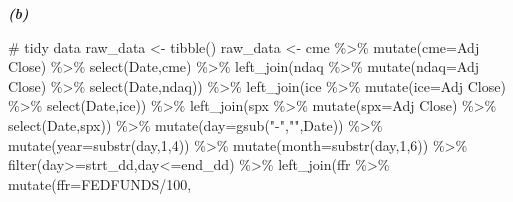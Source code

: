 \documentclass[
  a4paper,
  DIV=11,
  numbers=noendperiod]{scrreprt}
\newenvironment{Shaded}{\begin{snugshade}}{\end{snugshade}}
\newcommand{\AttributeTok}[1]{\textcolor[rgb]{0.40,0.45,0.13}{#1}}
\newcommand{\CommentTok}[1]{\textcolor[rgb]{0.37,0.37,0.37}{#1}}
\newcommand{\DecValTok}[1]{\textcolor[rgb]{0.68,0.00,0.00}{#1}}
\newcommand{\FunctionTok}[1]{\textcolor[rgb]{0.28,0.35,0.67}{#1}}
\newcommand{\NormalTok}[1]{\textcolor[rgb]{0.00,0.23,0.31}{#1}}
\newcommand{\OtherTok}[1]{\textcolor[rgb]{0.00,0.23,0.31}{#1}}
\newcommand{\SpecialCharTok}[1]{\textcolor[rgb]{0.37,0.37,0.37}{#1}}
\newcommand{\StringTok}[1]{\textcolor[rgb]{0.13,0.47,0.30}{#1}}
\begin{document}
\textbf{\emph{(b)}}

\begin{Shaded}
\begin{Highlighting}[]
\CommentTok{\# tidy data}
\NormalTok{raw\_data }\OtherTok{\textless{}{-}} \FunctionTok{tibble}\NormalTok{()}
\NormalTok{raw\_data }\OtherTok{\textless{}{-}}\NormalTok{ cme }\SpecialCharTok{\%\textgreater{}\%} \FunctionTok{mutate}\NormalTok{(}\AttributeTok{cme=}\StringTok{\textasciigrave{}}\AttributeTok{Adj Close}\StringTok{\textasciigrave{}}\NormalTok{) }\SpecialCharTok{\%\textgreater{}\%} \FunctionTok{select}\NormalTok{(Date,cme) }\SpecialCharTok{\%\textgreater{}\%} 
  \FunctionTok{left\_join}\NormalTok{(ndaq }\SpecialCharTok{\%\textgreater{}\%} \FunctionTok{mutate}\NormalTok{(}\AttributeTok{ndaq=}\StringTok{\textasciigrave{}}\AttributeTok{Adj Close}\StringTok{\textasciigrave{}}\NormalTok{) }\SpecialCharTok{\%\textgreater{}\%} \FunctionTok{select}\NormalTok{(Date,ndaq)) }\SpecialCharTok{\%\textgreater{}\%} 
  \FunctionTok{left\_join}\NormalTok{(ice }\SpecialCharTok{\%\textgreater{}\%} \FunctionTok{mutate}\NormalTok{(}\AttributeTok{ice=}\StringTok{\textasciigrave{}}\AttributeTok{Adj Close}\StringTok{\textasciigrave{}}\NormalTok{) }\SpecialCharTok{\%\textgreater{}\%} \FunctionTok{select}\NormalTok{(Date,ice)) }\SpecialCharTok{\%\textgreater{}\%} 
  \FunctionTok{left\_join}\NormalTok{(spx }\SpecialCharTok{\%\textgreater{}\%} \FunctionTok{mutate}\NormalTok{(}\AttributeTok{spx=}\StringTok{\textasciigrave{}}\AttributeTok{Adj Close}\StringTok{\textasciigrave{}}\NormalTok{) }\SpecialCharTok{\%\textgreater{}\%} \FunctionTok{select}\NormalTok{(Date,spx)) }\SpecialCharTok{\%\textgreater{}\%} 
  \FunctionTok{mutate}\NormalTok{(}\AttributeTok{day=}\FunctionTok{gsub}\NormalTok{(}\StringTok{"{-}"}\NormalTok{,}\StringTok{""}\NormalTok{,Date)) }\SpecialCharTok{\%\textgreater{}\%} 
  \FunctionTok{mutate}\NormalTok{(}\AttributeTok{year=}\FunctionTok{substr}\NormalTok{(day,}\DecValTok{1}\NormalTok{,}\DecValTok{4}\NormalTok{)) }\SpecialCharTok{\%\textgreater{}\%} 
  \FunctionTok{mutate}\NormalTok{(}\AttributeTok{month=}\FunctionTok{substr}\NormalTok{(day,}\DecValTok{1}\NormalTok{,}\DecValTok{6}\NormalTok{)) }\SpecialCharTok{\%\textgreater{}\%} 
  \FunctionTok{filter}\NormalTok{(day}\SpecialCharTok{\textgreater{}=}\NormalTok{strt\_dd,day}\SpecialCharTok{\textless{}=}\NormalTok{end\_dd) }\SpecialCharTok{\%\textgreater{}\%} 
  \FunctionTok{left\_join}\NormalTok{(ffr }\SpecialCharTok{\%\textgreater{}\%} 
              \FunctionTok{mutate}\NormalTok{(}\AttributeTok{ffr=}\NormalTok{FEDFUNDS}\SpecialCharTok{/}\DecValTok{100}\NormalTok{,}

\end{Highlighting}
\end{Shaded}
\end{document}
